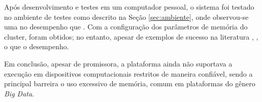 

Após desenvolvimento e testes em um computador pessoal, o sistema foi testado no
ambiente de testes como descrito na Seção \ref{sec:ambiente}, onde observou-se uma
 no desempenho que .
Com a configuração dos parâmetros de memória do cluster,  foram obtidos; no entanto, apesar de exemplos de
sucesso na literatura
\cite{lee2017data,Greco2019wearableStream,battulga2020fogguru}, , o que  o desempenho.

Em conclusão, apesar de promissora, a plataforma \flink ainda não suportava a
execução em dispositivos computacionais restritos de maneira confiável, sendo a
principal barreira o uso excessivo de memória, comum em plataformas do gênero
\emph{Big Data}.

